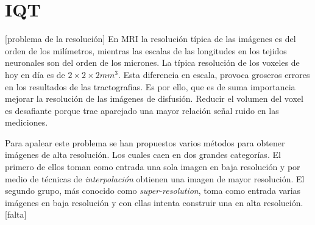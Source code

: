 \documentclass[11pt,a4paper,twoside]{tesis}
\begin{document}
\section{IQT}
[problema de la resoluci\'on]
En MRI la resoluci\'on t\'ipica de las im\'agenes es del orden de los mil\'imetros, mientras las 
escalas de las longitudes en los tejidos neuronales son del orden de los micrones. La t\'ipica 
resoluci\'on de los voxeles de hoy en d\'ia es de $2\times2\times2 mm^3$. Esta diferencia en 
escala, provoca groseros errores en los resultados de las tractografias. Es por ello, que es de 
suma importancia mejorar la resoluci\'on de las im\'agenes de disfusi\'on. Reducir el volumen del 
voxel es desafiante porque trae aparejado una mayor relaci\'on se\~nal ruido en las mediciones. 

Para apalear este problema se han propuestos varios m\'etodos para obtener im\'agenes de alta 
resoluci\'on. Los cuales caen en dos grandes categor\'ias. El primero de ellos toman como 
entrada una sola imagen en baja resoluci\'on y por medio de t\'ecnicas de 
\textit{interpolaci\'on} obtienen una imagen de mayor resoluci\'on. El segundo grupo, m\'as 
conocido como \textit{super-resolution}, toma como entrada varias im\'agenes en baja resoluci\'on y 
con ellas intenta construir una en alta resoluci\'on. [falta]












\end{document}
